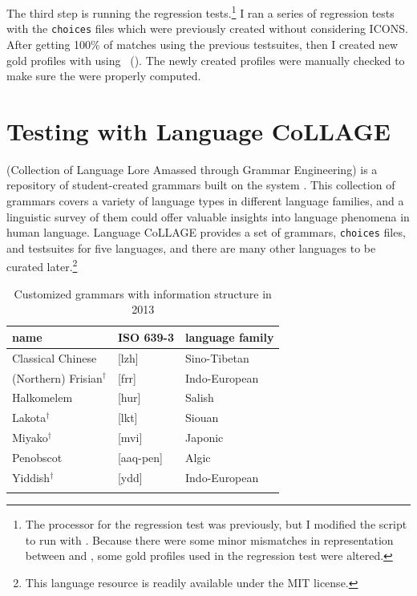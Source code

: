 The third step is running the regression tests.\footnote{The processor
  for the regression test was {\isi{\lkb}} previously, but I modified
  the script to run with \isi{\ace}. Because there were some minor
  mismatches in representation between \isi{\lkb} and \isi{\ace}, some
  gold profiles used in the regression test were altered.}  I ran a series of 
regression tests with the \texttt{choices} files 
which were previously created without considering ICONS.
After getting 100\% of matches using the previous
testsuites, then I created new gold profiles with  using
\isi{\ace}~().  The newly
created profiles were manually checked to make sure the 
were properly computed.



\section{Testing with Language CoLLAGE}
\label{13:sec:collage}

 (Collection of Language Lore Amassed through
Grammar Engineering) is a repository of student-created grammars built
on the \lingo {} system \citep{bender:14}.  This
collection of grammars covers a variety of language types in different
language families, and a linguistic survey of them could offer
valuable insights into language phenomena in human language.  Language
CoLLAGE provides a set of grammars,
\texttt{choices} files, and testsuites for five languages, and there
are many other languages to be curated later.\footnote{This language resource
is readily available under the MIT license.}



\begin{table}[!t]
\small
\centering
\caption{Customized grammars with information structure in 2013}
\label{tbl:ling567:2013}
\begin{tabular}{lll}
\lsptoprule
\textbf{name} & \textbf{ISO 639-3} & \textbf{language family} \\ \hline
\midrule 
Classical Chinese & [lzh] & Sino-Tibetan\\ 
(Northern) Frisian$^\ensuremath{\dagger}$ & [frr] & Indo-European\\ 
Halkomelem & [hur] & Salish\\ 
Lakota$^\ensuremath{\dagger}$ & [lkt] & Siouan\\ 
Miyako$^\ensuremath{\dagger}$ & [mvi] & Japonic\\ 
Penobscot & [aaq-pen] & Algic\\ 
Yiddish$^\ensuremath{\dagger}$ & [ydd]	& Indo-European\\ 
\lspbottomrule
\end{tabular}
\end{table}


